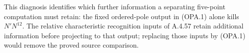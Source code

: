 This diagnosis identifies which further information a separating
five-point computation must retain: the fixed ordered-pole output
in (OPA.1) alone kills $N'N^{12}$.  The relative characteristic
recognition inputs of A.4.57 retain additional information before
projecting to that output; replacing those inputs by (OPA.1) would
remove the proved source comparison.
